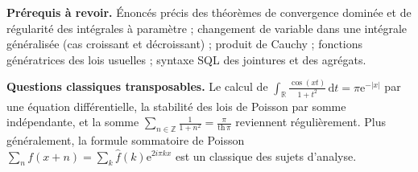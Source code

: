 \documentclass[11pt,a4paper]{article}
\begin{document}
\textbf{Prérequis à revoir.} Énoncés précis des théorèmes de convergence dominée et de régularité des intégrales à paramètre ; changement de variable dans une intégrale généralisée (cas croissant et décroissant) ; produit de Cauchy ; fonctions génératrices des lois usuelles ; syntaxe SQL des jointures et des agrégats.

\textbf{Questions classiques transposables.} Le calcul de \(\int_{\mathbb{R}}\frac{\cos(xt)}{1+t^2}\,\mathrm{d}t=\pi{\mathrm{e}}^{-|x|}\) par une équation différentielle, la stabilité des lois de Poisson par somme indépendante, et la somme \(\sum_{n\in\mathbb{Z}}\frac{1}{1+n^2}=\frac{\pi}{\mathrm{th}\,\pi}\) reviennent régulièrement. Plus généralement, la formule sommatoire de Poisson \(\sum_n f(x+n)=\sum_k\hat f(k){\mathrm{e}}^{2i\pi kx}\) est un classique des sujets d'analyse.
\end{document}
